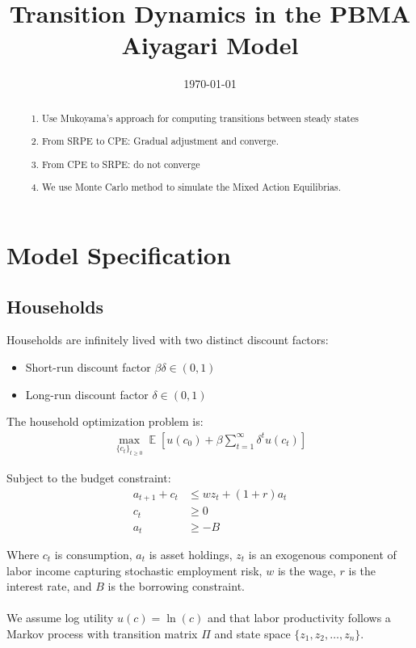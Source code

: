 \documentclass[11pt,a4paper]{article}
\title{\vspace{-1.5cm}\LARGE\textbf{Transition Dynamics in the PBMA Aiyagari Model}}
\date{\today}
\DeclareMathOperator{\E}{\mathbb{E}}
\begin{document}
\maketitle

\begin{abstract}
\noindent
\begin{enumerate}
    \item Use Mukoyama's approach for computing transitions between steady states
    \item From SRPE to CPE: Gradual adjustment and converge.
    \item From CPE to SRPE: do not converge
    \item We use Monte Carlo method to simulate the Mixed Action Equilibrias. 
\end{enumerate}
\end{abstract}

\section{Model Specification}

\subsection{Households}

Households are infinitely lived with two distinct discount factors:
\begin{itemize}
    \item Short-run discount factor $\beta\delta \in (0,1)$
    \item Long-run discount factor $\delta \in (0,1)$
\end{itemize}

\noindent The household optimization problem is:
\begin{align}
\max_{\{c_t\}_{t\geq 0}} \E\left[u(c_0) + \beta \sum_{t=1}^{\infty} \delta^t u(c_t)\right]
\end{align}

\noindent Subject to the budget constraint:
\begin{align}
a_{t+1} + c_t &\leq wz_t + (1 + r)a_t\\
c_t &\geq 0\\
a_t &\geq -B
\end{align}

\noindent Where $c_t$ is consumption, $a_t$ is asset holdings, $z_t$ is an exogenous component of labor income capturing stochastic employment risk, $w$ is the wage, $r$ is the interest rate, and $B$ is the borrowing constraint.\\
\\
\noindent We assume log utility $u(c) = \ln(c)$ and that labor productivity follows a Markov process with transition matrix $\Pi$ and state space $\{z_1, z_2, \ldots, z_n\}$.
\end{document}
